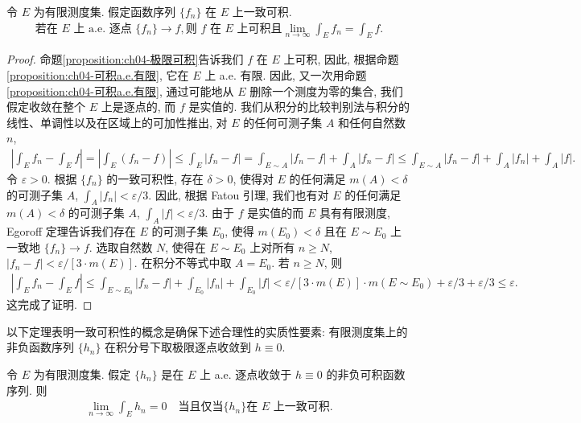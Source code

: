 \documentclass[../../main.tex]{subfiles}
\begin{document}
\begin{theorem}\label{theorem:ch04-Vitali}
令 $E$ 为有限测度集. 假定函数序列 $\{f_{n}\}$ 在 $E$ 上一致可积.
\begin{align*}
\text{若在 }E\text{ 上 a.e. 逐点 }\{f_{n}\}\to f,\text{则 }f\text{ 在 }E\text{ 上可积且}\lim_{n\to\infty}\int_{E}f_{n}=\int_{E}f.
\end{align*}
\end{theorem}

\begin{proof}
命题\cref{proposition:ch04-极限可积}告诉我们 $f$ 在 $E$ 上可积, 因此, 根据命题\cref{proposition:ch04-可积a.e.有限}, 它在 $E$ 上 a.e. 有限. 因此, 又一次用命题\cref{proposition:ch04-可积a.e.有限}, 通过可能地从 $E$ 删除一个测度为零的集合, 我们假定收敛在整个 $E$ 上是逐点的, 而 $f$ 是实值的. 我们从积分的比较判别法与积分的线性、单调性以及在区域上的可加性推出, 对 $E$ 的任何可测子集 $A$ 和任何自然数 $n$,
\begin{align*}
\left|\int_{E}f_{n}-\int_{E}f\right|=\left|\int_{E}(f_{n}-f)\right|\leqslant\int_{E}|f_{n}-f|=\int_{E\sim A}|f_{n}-f|+\int_{A}|f_{n}-f|\leqslant\int_{E\sim A}|f_{n}-f|+\int_{A}|f_{n}|+\int_{A}|f|.
\end{align*}
令 $\varepsilon>0$. 根据 $\{f_{n}\}$ 的一致可积性, 存在 $\delta>0$, 使得对 $E$ 的任何满足 $m(A)<\delta$ 的可测子集 $A$, $\int_{A}|f_{n}|<\varepsilon/3$. 因此, 根据 Fatou 引理, 我们也有对 $E$ 的任何满足 $m(A)<\delta$ 的可测子集 $A$, $\int_{A}|f|<\varepsilon/3$. 由于 $f$ 是实值的而 $E$ 具有有限测度, Egoroff 定理告诉我们存在 $E$ 的可测子集 $E_{0}$, 使得 $m(E_{0})<\delta$ 且在 $E\sim E_{0}$ 上一致地 $\{f_{n}\}\to f$. 选取自然数 $N$, 使得在 $E\sim E_{0}$ 上对所有 $n\geqslant N$, $|f_{n}-f|<\varepsilon/[3\cdot m(E)]$. 在积分不等式中取 $A=E_{0}$. 若 $n\geqslant N$, 则
\begin{align*}
\left|\int_{E}f_{n}-\int_{E}f\right|\leqslant\int_{E\sim E_{0}}|f_{n}-f|+\int_{E_{0}}|f_{n}|+\int_{E_{0}}|f|<\varepsilon/[3\cdot m(E)]\cdot m(E\sim E_{0})+\varepsilon/3+\varepsilon/3\leqslant\varepsilon.
\end{align*}
这完成了证明.
\end{proof}

以下定理表明一致可积性的概念是确保下述合理性的实质性要素: 有限测度集上的非负函数序列 $\{h_{n}\}$ 在积分号下取极限逐点收敛到 $h\equiv 0$.

\begin{theorem}\label{theorem:ch04-一致可积判定}
令 $E$ 为有限测度集. 假定 $\{h_{n}\}$ 是在 $E$ 上 a.e. 逐点收敛于 $h\equiv 0$ 的非负可积函数序列. 则
\begin{align*}
\lim_{n\to\infty}\int_{E}h_{n}=0\quad\text{当且仅当}\{h_{n}\}\text{在 }E\text{ 上一致可积}.
\end{align*}
\end{theorem}
\end{document}
